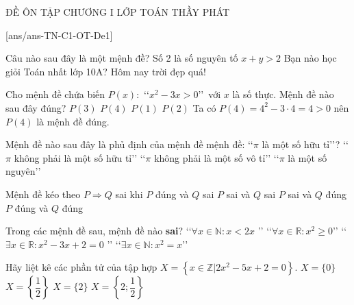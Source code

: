 \begin{name}
	{\tenchude}
	{ĐỀ ÔN TẬP CHƯƠNG I}
	{LỚP TOÁN THẦY PHÁT}
	{\thoigian}
\end{name}
\TN
\setcounter{ex}{0}
[ans/ans-TN-C1-OT-De1]

\begin{ex}%
	Câu nào sau đây là một mệnh đề?
	\choice
	{\True Số 2 là số nguyên tố}
	{$x+y>2$}
	{Bạn nào học giỏi Toán nhất lớp 10A?}
	{Hôm nay trời đẹp quá!}
\end{ex}

\begin{ex}%
	Cho mệnh đề chứa biến $P(x)\colon$ \lq\lq  $x^{2}-3x>0$\rq\rq\ với $x$ là số thực. Mệnh đề nào sau đây đúng?
	\choice
	{$P(3)$}
	{\True $P(4)$}
	{$P(1)$}
	{$P(2)$}
	\loigiai
	{
		Ta có $P(4)=4^2-3\cdot4=4>0$ nên $P(4)$ là mệnh đề đúng.
	}
\end{ex}

\begin{ex}%
	Mệnh đề nào sau đây là phủ định của mệnh đề mệnh đề: \lq\lq  $\pi$ là một số hữu tỉ\rq\rq?
	{\True\lq\lq  $\pi$ không phải là một số hữu tỉ\rq\rq}
	{\lq\lq  $\pi$ không phải là một số vô tỉ\rq\rq}
	{\lq\lq  $\pi$ là một số nguyên\rq\rq}
\end{ex}
\begin{ex}%
	Mệnh đề kéo theo $P \Rightarrow Q$ sai khi
	\choice
	{\True $P$ đúng và $Q$ sai}
	{$P$ sai và $Q$ sai}
	{$P$ sai và $Q$ đúng}
	{$P$ đúng và $Q$ đúng}
\end{ex}

\begin{ex}%
	Trong các mệnh đề sau, mệnh đề nào \textbf{sai}?
	\choice
	{\True \lq\lq  $\forall x \in \mathbb{N}: x<2 x $ \rq\rq}
	{\lq\lq  $\forall x \in \mathbb{R}: x^2 \geq 0 $\rq\rq}
	{\lq\lq  $\exists x \in \mathbb{R}: x^2-3 x+2=0$ \rq\rq}
	{\lq\lq  $\exists x \in \mathbb{N}: x^2=x$\rq\rq}
\end{ex}

\begin{ex}%
	Hãy liệt kê các phần tử của tập hợp $X=\left\{x \in \mathbb{Z} | 2 x^{2}-5 x+2=0\right\}$.
	\choice
	{$X=\{0\}$}
	{$X=\left\{\dfrac{1}{2}\right\}$}
	{\True $X=\{2\}$}
	{$X=\left\{2 ; \dfrac{1}{2}\right\}$}
\end{ex}

